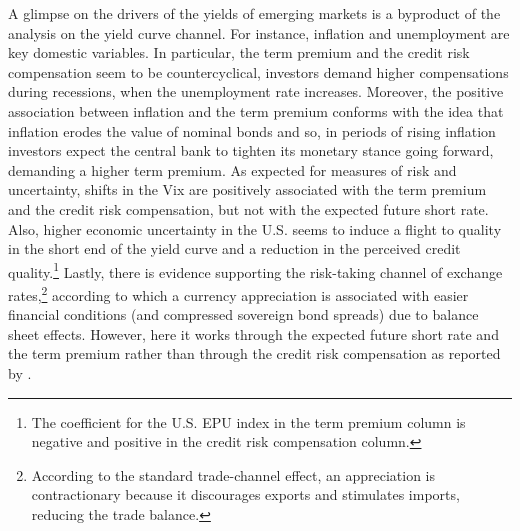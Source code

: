 {%

A glimpse on the drivers of the yields of emerging markets is a byproduct of the analysis on the yield curve channel.
For instance, inflation and unemployment are key domestic variables.
In particular, the term premium and the credit risk compensation seem to be countercyclical, investors demand higher compensations during recessions, when the unemployment rate increases. 
Moreover, the positive association between inflation and the term premium conforms with the idea that inflation erodes the value of nominal bonds and so, in periods of rising inflation investors expect the central bank to tighten its monetary stance going forward, demanding a higher term premium. 
As expected for measures of risk and uncertainty, shifts in the Vix are positively associated with the term premium and the credit risk compensation, but not with the expected future short rate.
Also, higher economic uncertainty in the U.S. seems to induce a flight to quality in the short end of the yield curve and a reduction in the perceived credit quality.\footnote{ The coefficient for the U.S. EPU index in the term premium column is negative and positive in the credit risk compensation column.}
Lastly, there is evidence supporting the risk-taking channel of exchange rates,\footnote{ According to the standard trade-channel effect, an appreciation is contractionary because it discourages exports and stimulates imports, reducing the trade balance.} 
according to which a currency appreciation is associated with easier financial conditions (and compressed sovereign bond spreads) due to balance sheet effects.
However, here it works through the expected future short rate and the term premium rather than through the credit risk compensation as reported by \cite{HofmannShimShin:2019}.

}
